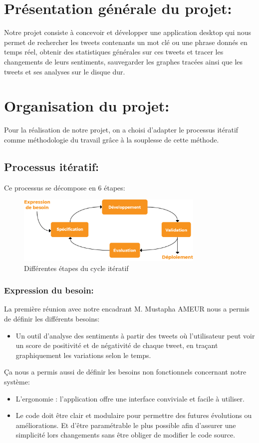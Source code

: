 \section{Présentation générale du projet:}
Notre projet consiste à concevoir et développer une application desktop qui nous permet de rechercher les tweets contenants un mot clé ou une phrase donnés en temps réel, obtenir des statistiques générales sur ces tweets et tracer les changements de leurs sentiments, sauvegarder les graphes tracées ainsi que les tweets et ses analyses sur le disque dur.
\section{Organisation du projet:}
Pour la réalisation de notre projet, on a choisi d'adapter le processus itératif comme méthodologie du travail grâce à la souplesse de cette méthode.
\subsection{Processus itératif:}
Ce processus se décompose en 6 étapes:
\begin{figure}[H]
    \centering
    \includegraphics[width=0.8\textwidth]{contexte-generale/assets/cycleiteratif.png}
    \caption{Différentes étapes du cycle itératif}
    \label{fig:my_label}
\end{figure}
\subsubsection{Expression du besoin:}
La première réunion avec notre encadrant M. Mustapha AMEUR nous a permis de définir les différents besoins: 
\begin{itemize}
    \item Un outil d'analyse des sentiments à partir des tweets où l'utilisateur peut voir un score de positivité et de négativité de chaque tweet, en traçant graphiquement les variations selon le temps.  
\end{itemize}
Ça nous a permis aussi de définir les besoins non fonctionnels concernant notre système:
\begin{itemize}
    \item L’ergonomie : l’application offre une interface conviviale et facile à utiliser.
    \item Le code doit être clair et modulaire pour permettre des futures évolutions ou améliorations. Et d’être paramétrable le plus possible afin d’assurer une simplicité lors changements sans être obliger de modifier le code source.
\end{itemize}
